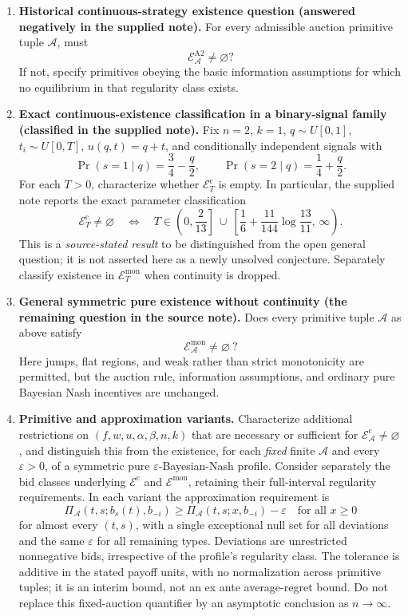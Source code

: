 \documentclass[11pt,a4paper]{article}
\begin{document}
\begin{enumerate}[label=\textbf{(\alph*)},leftmargin=2.5em]
	\item \textbf{Historical continuous-strategy existence question
		(answered negatively in the supplied note).}
	For every admissible auction primitive tuple $\mathcal A$, must
	\[
	\mathcal E_{\mathcal A}^{\mathrm{A2}}\ne\varnothing?
	\]
	If not, specify primitives obeying the basic information assumptions
	for which no equilibrium in that regularity class exists.
	
	\item \textbf{Exact continuous-existence classification in a binary-signal
		family (classified in the supplied note).}
	Fix $n=2$, $k=1$, $q\sim U[0,1]$,
	$t_i\sim U[0,T]$, $u(q,t)=q+t$, and conditionally independent signals
	with
	\[
	\Pr(s=1\mid q)=\frac34-\frac q2,\qquad
	\Pr(s=2\mid q)=\frac14+\frac q2.
	\]
	For each $T>0$, characterize whether
	$\mathcal E_T^{\mathrm c}$ is empty. In particular, the supplied
	note reports the exact parameter classification
	\[
	\mathcal E_T^{\mathrm c}\ne\varnothing
	\quad\Longleftrightarrow\quad
	T\in\left(0,\frac{2}{13}\right]
	\ \cup\
	\left[\frac16+\frac{11}{144}\log\!\frac{13}{11},\,\infty\right).
	\]
	This is a \emph{source-stated result} to be distinguished from the
	open general question; it is not asserted here as a newly unsolved
	conjecture. Separately classify existence in
	$\mathcal E_T^{\mathrm{mon}}$ when continuity is dropped.
	
	\item \textbf{General symmetric pure existence without continuity
		(the remaining question in the source note).}
	Does every primitive tuple $\mathcal A$ as above satisfy
	\[
	\boxed{\quad\mathcal E_{\mathcal A}^{\mathrm{mon}}
		\ne\varnothing\ ?\quad}
	\]
	Here jumps, flat regions, and weak rather than strict monotonicity are
	permitted, but the auction rule, information assumptions, and ordinary
	pure Bayesian Nash incentives are unchanged.
	
	\item \textbf{Primitive and approximation variants.}
	Characterize additional restrictions on $(f,w,u,\alpha,\beta,n,k)$
	that are necessary or sufficient for
	$\mathcal E_{\mathcal A}^{\mathrm c}\ne\varnothing$, and distinguish
	this from the existence, for each \emph{fixed} finite $\mathcal A$
	and every $\varepsilon>0$, of a symmetric pure
	$\varepsilon$-Bayesian-Nash profile. Consider separately the bid
	classes underlying $\mathcal E^{\mathrm c}$ and
	$\mathcal E^{\mathrm{mon}}$, retaining their full-interval regularity
	requirements. In each variant the approximation requirement is
	\[
	\Pi_{\mathcal A}(t,s;b_s(t),b_{-i})
	\ge \Pi_{\mathcal A}(t,s;x,b_{-i})-\varepsilon
	\quad\text{for all }x\ge0
	\]
	for almost every $(t,s)$, with a single exceptional null set for all
	deviations and the same $\varepsilon$ for all remaining types.
	Deviations are unrestricted nonnegative bids, irrespective of the
	profile's regularity class. The tolerance is additive in the stated
	payoff units, with no normalization across primitive tuples; it is
	an interim bound, not an ex ante average-regret bound.
	Do not replace this fixed-auction quantifier by
	an asymptotic conclusion as $n\to\infty$.
\end{enumerate}
\end{document}
